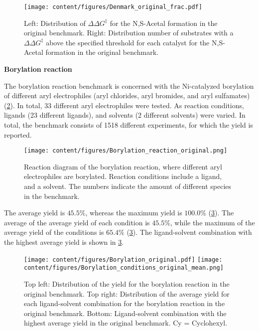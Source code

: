 \begin{figure}[htb]
    \centering
    \texttt{[image: content/figures/Denmark\_original\_frac.pdf]}
    \caption{Left: Distribution of $\Delta\Delta G^{\ddagger}$ for the N,S-Acetal formation in the original benchmark. Right: Distribution number of substrates with a  $\Delta\Delta G^{\ddagger}$ above the specified threshold for each catalyst for the N,S-Acetal formation in the original benchmark.}
    \label{fig:Denmark_EDA_frac}
\end{figure}
\newpage
\textbf{Borylation reaction}

The borylation reaction benchmark is concerned with the Ni-catalyzed borylation of different aryl electrophiles (aryl chlorides, aryl bromides, and aryl sulfamates) (\cref{fig:Borylation_reaction}). 
In total, 33 different aryl electrophiles were tested. 
As reaction conditions, ligands (23 different ligands), and solvents (2 different solvents) were varied. 
In total, the benchmark consists of 1518 different experiments, for which the yield is reported.

\begin{figure}[h]
    \centering
    \texttt{[image: content/figures/Borylation\_reaction\_original.png]}
    \caption{Reaction diagram of the borylation reaction, where different aryl electrophiles are borylated. Reaction conditions include a ligand, and a solvent. The numbers indicate the amount of different species in the benchmark.}
    \label{fig:Borylation_reaction}
\end{figure}

The average yield is $45.5\%$, whereas the maximum yield is $100.0\%$ (\cref{fig:Borylation_EDA}).
The average of the average yield of each condition is $45.5\%$, while the maximum of the average yield of the conditions is $65.4\%$ (\cref{fig:Borylation_EDA}).
The ligand-solvent combination with the highest average yield is shown in \cref{fig:Borylation_EDA}.

\begin{figure}[h]
    \centering
    \texttt{[image: content/figures/Borylation\_original.pdf]}
    \texttt{[image: content/figures/Borylation\_conditions\_original\_mean.png]}
    \caption{Top left: Distribution of the yield for the borylation reaction in the original benchmark. Top right: Distribution of the average yield for each ligand-solvent combination for the borylation reaction in the original benchmark. Bottom: Ligand-solvent combination with the highest average yield in the original benchmark. Cy = Cyclohexyl.}
    \label{fig:Borylation_EDA}
\end{figure}

